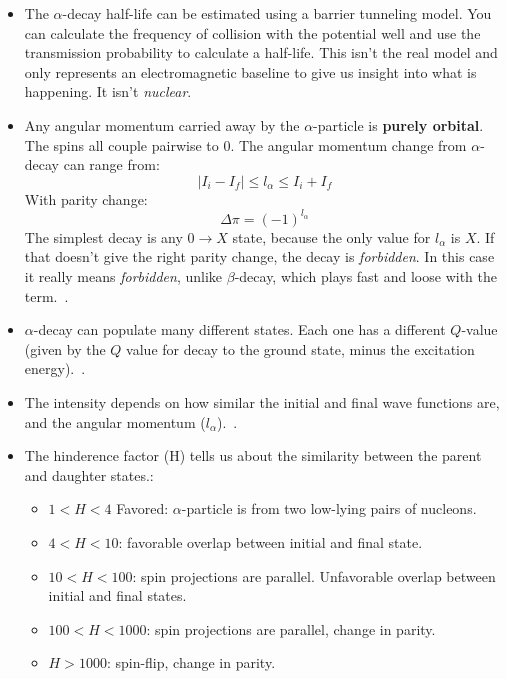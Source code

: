 \documentclass[letter]{article}
\begin{document}
\begin{itemize}
\item The $\alpha$-decay half-life can be estimated using a barrier
  tunneling model. You can calculate the frequency of collision with
  the potential well and use the transmission probability to calculate
  a half-life. This isn't the real model and only represents an
  electromagnetic baseline to give us insight into what is
  happening. It isn't \textit{nuclear}.~\cite[Lec. 18]{lecture}
\item Any angular momentum carried away by the $\alpha$-particle is
  \textbf{purely orbital}. The spins all couple pairwise to
  0. The angular momentum change from $\alpha$-decay can range from:
  \begin{equation*}
    |I_i-I_f| \leq l_{\alpha} \leq I_i + I_f
  \end{equation*}
With parity change:
\begin{equation*}
  \Delta\pi = {(-1)}^{l_{\alpha}}
\end{equation*}
The simplest decay is any $0 \to X$ state, because the only value
for $l_{\alpha}$ is $X$. If that doesn't give the right parity change,
the decay is \textit{forbidden}. In this case it really means
\textit{forbidden}, unlike $\beta$-decay, which plays fast and loose
with the term.~\cite[pp. 257-258]{krane}.
\item $\alpha$-decay can populate many different states. Each one has
  a different $Q$-value (given by the $Q$ value for decay to the
  ground state, minus the excitation
  energy).~\cite[pp. 257-258]{krane}.
\item The intensity depends on how similar the initial and final wave
  functions are, and the angular momentum ($l_{\alpha}$).~\cite[pp. 257-258]{krane}.
\item The hinderence factor (H) tells us about the similarity between
  the parent and daughter states.:
  \begin{itemize}
  \item $1<H<4$ Favored: $\alpha$-particle is from two low-lying pairs
    of nucleons.
  \item $4<H<10$: favorable overlap between initial and final state.
  \item $10<H<100$: spin projections are parallel. Unfavorable overlap
    between initial and final states.
  \item $100<H<1000$: spin projections are parallel, change in parity.
  \item $H>1000$: spin-flip, change in parity.

\end{itemize}
\end{itemize}
\end{document}
